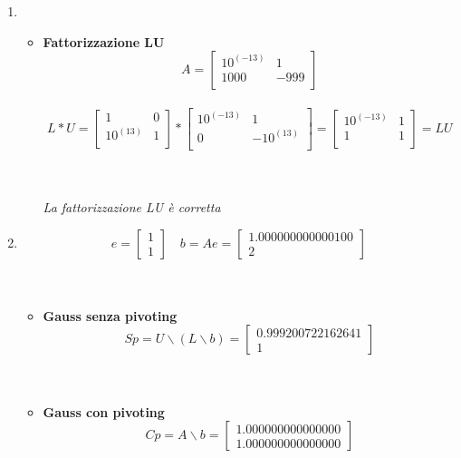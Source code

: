 \begin{enumerate}
	\item 
	\begin{itemize}
		\item \textbf{Fattorizzazione LU}
			\[
			A =\begin{bmatrix}
				10^{(-13)} &   1  \\
	 			1000   & -999 \\
			\end{bmatrix}
			\]\\
			\[
			L*U =\begin{bmatrix}
				1    & 0 \\
				10^{(13)} & 1 \\
			\end{bmatrix} *
			\begin{bmatrix}
				10^{(-13)} & 1    \\
				0      	  & -10^{(13)} \\
			\end{bmatrix} 
			= \begin{bmatrix}
				10^{(-13)} &   1  \\
				1   & 1 \\
			\end{bmatrix} = LU
			\]\\\
			\begin{center}
				\textit{La fattorizzazione LU è corretta}
			\end{center}
	\end{itemize}
	\item
		\[
		e = \begin{bmatrix}
			1 \\
			1
		\end{bmatrix} \quad 
		b = Ae =\begin{bmatrix}
			1.000000000000100 \\
			2                 
		\end{bmatrix}
		\]\\\
	\begin{itemize}
	\item \textbf{Gauss senza pivoting}
		\[
		Sp = U \backslash (L \backslash b) = \begin{bmatrix}
			0.999200722162641 \\
    		1
		\end{bmatrix}
		\]\\\
	\end{itemize}
	\begin{itemize}
	\item \textbf{Gauss con pivoting}
		\[
		Cp = A \backslash b =\begin{bmatrix}
			1.000000000000000 \\
    		1.000000000000000 
		\end{bmatrix}
		\]
	\end{itemize}
\end{enumerate}